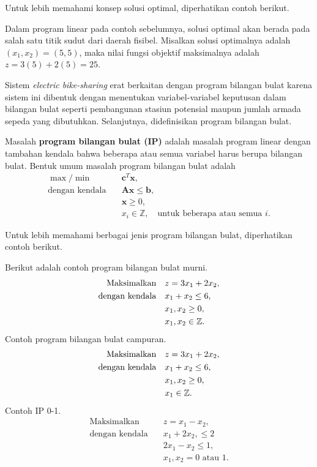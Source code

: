 Untuk lebih memahami konsep solusi optimal, diperhatikan contoh berikut.
\begin{contoh}
    Dalam program linear pada contoh sebelumnya, solusi optimal akan berada pada salah satu titik sudut dari daerah fisibel. Misalkan solusi optimalnya adalah $(x_1, x_2) = (5, 5)$, maka nilai fungsi objektif maksimalnya adalah $z = 3(5) + 2(5) = 25$.
\end{contoh}

Sistem \textit{electric bike-sharing} erat berkaitan dengan program bilangan bulat karena sistem ini dibentuk dengan menentukan variabel-variabel keputusan dalam bilangan bulat seperti pembangunan stasiun potensial maupun jumlah armada sepeda yang dibutuhkan. Selanjutnya, didefinisikan program bilangan bulat.

\begin{definisi}
    Masalah \textbf{program bilangan bulat (IP)} adalah masalah program linear dengan tambahan kendala bahwa beberapa atau semua variabel harus berupa bilangan bulat. Bentuk umum masalah program bilangan bulat adalah
    \begin{align*}
        \max/\min \quad & \boldsymbol{c}^T \boldsymbol{x}, \\
        \text{dengan kendala} \quad & \boldsymbol{Ax} \leq \boldsymbol{b}, \\
        & \boldsymbol{x} \geq 0,\\
        & x_i \in \mathbb{Z}, \quad \text{untuk beberapa atau semua } i.
    \end{align*}
\end{definisi}

Untuk lebih memahami berbagai jenis program bilangan bulat, diperhatikan contoh berikut.
\begin{contoh}
    Berikut adalah contoh program bilangan bulat murni.
    $$\begin{aligned}
        \text{Maksimalkan} \quad & z = 3x_1 + 2x_2, \\
        \text{dengan kendala} \quad & x_1 + x_2 \leq 6, \\
        & x_1, x_2 \geq 0, \\
        & x_1, x_2 \in \mathbb{Z}.
    \end{aligned}$$
    Contoh program bilangan bulat campuran.
    $$\begin{aligned}
        \text{Maksimalkan} \quad & z = 3x_1 + 2x_2 ,\\
        \text{dengan kendala} \quad & x_1 + x_2 \leq 6, \\
        & x_1, x_2 \geq 0 ,\\
        & x_1 \in \mathbb{Z}.
    \end{aligned}$$
    Contoh IP 0-1.
    $$\begin{aligned}
        \text{Maksimalkan} \quad & z = x_1 - x_2,\\
        \text{dengan kendala} \quad & x_1 + 2x_2,\leq 2 \\
        & 2x_1 - x_2 \leq 1, \\
        & x_1, x_2 = 0 \text{ atau } 1.
    \end{aligned}$$
\end{contoh}

